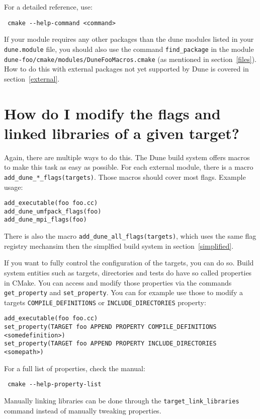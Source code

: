 \documentclass[a4paper,10pt,DIV9,headings=small]{scrartcl}
\begin{document}
For a detailed reference, use:
\begin{lstlisting}
 cmake --help-command <command>
\end{lstlisting}

If your module requires any other packages than the dune modules listed in your \lstinline!dune.module! file, you should also use the command \lstinline!find_package! in the module \lstinline!dune-foo/cmake/modules/DuneFooMacros.cmake! (as mentioned in section~\ref{files}). How to do this with external packages not yet supported by Dune is covered in section~\ref{external}.

\section{How do I modify the flags and linked libraries of a given target?}
\label{target}
Again, there are multiple ways to do this. The Dune build system offers macros to make this task as easy as possible. For each external module, there is a macro \lstinline!add_dune_*_flags(targets)!. Those macros should cover most flags. Example usage:
\begin{lstlisting}
add_executable(foo foo.cc)
add_dune_umfpack_flags(foo)
add_dune_mpi_flags(foo)
\end{lstlisting}
There is also the macro \lstinline!add_dune_all_flags(targets)!, which uses the same flag registry mechansim then the simplfied build system in section~\ref{simplified}.

If you want to fully control the configuration of the targets, you can do so. Build system entities such as targets, directories and tests do have so called properties in CMake. You can access and modify those properties via the commands \lstinline!get_property! and \lstinline!set_property!. You can for example use those to modify a targets \lstinline!COMPILE_DEFINITIONS! or \lstinline!INCLUDE_DIRECTORIES! property:
\begin{lstlisting}
add_executable(foo foo.cc)
set_property(TARGET foo APPEND PROPERTY COMPILE_DEFINITIONS <somedefinition>)
set_property(TARGET foo APPEND PROPERTY INCLUDE_DIRECTORIES <somepath>)
\end{lstlisting}
For a full list of properties, check the manual:
\begin{lstlisting}
 cmake --help-property-list
\end{lstlisting}
Manually linking libraries can be done through the \lstinline!target_link_libraries! command instead of manually tweaking properties.
\end{document}

